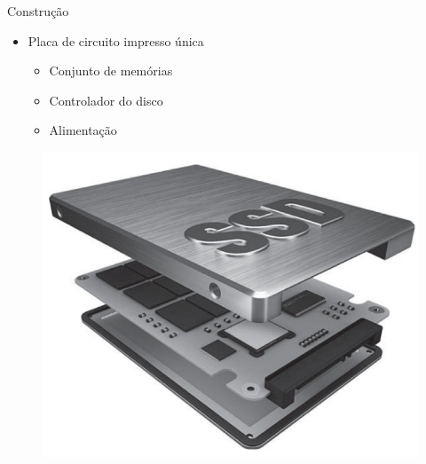 \documentclass[aspectratio=169,
				xcolor=table]{beamer}
\begin{document}
	\begin{frame}{Construção}
		\begin{itemize}
			\item Placa de circuito impresso única
			\begin{itemize}
				\item Conjunto de memórias
				\item Controlador do disco
				\item Alimentação
			\end{itemize}
			
		\end{itemize}
		
		\begin{figure}[hbtp]
		\centering
		\includegraphics[height=0.4\textheight, keepaspectratio]{../figs/cap08/ssd01.png}
		\end{figure}
		
	\end{frame}
\end{document}
